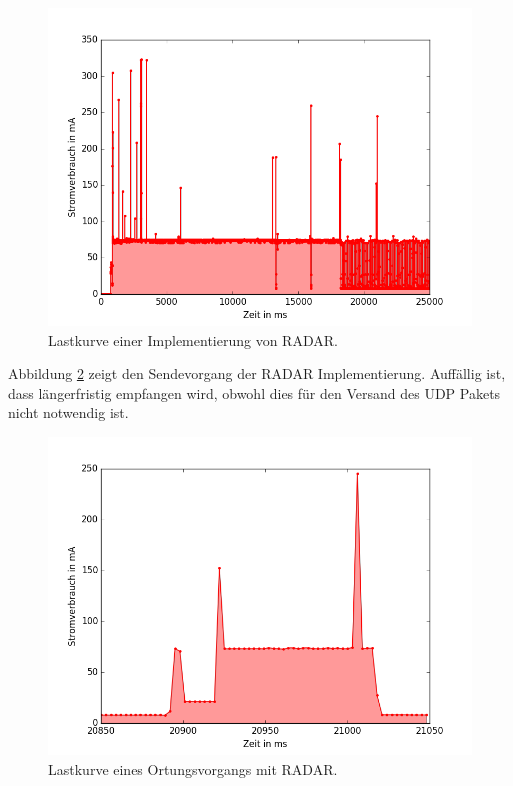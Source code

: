 \begin{figure}[h!]
  \centering
	\includegraphics[width=\textwidth]{plots/radar5s.png}
  \caption{Lastkurve einer Implementierung von RADAR.}
  \label{fig:radar5s}
\end{figure}

Abbildung \ref{fig:radar5ssend} zeigt den Sendevorgang der RADAR Implementierung.
Auffällig ist, dass längerfristig empfangen wird, obwohl dies für den Versand des UDP Pakets nicht notwendig ist.\\

\begin{figure}[h!]
  \centering
	\includegraphics[width=\textwidth]{plots/radar5ssend.png}
  \caption{Lastkurve eines Ortungsvorgangs mit RADAR.}
  \label{fig:radar5ssend}
\end{figure}

